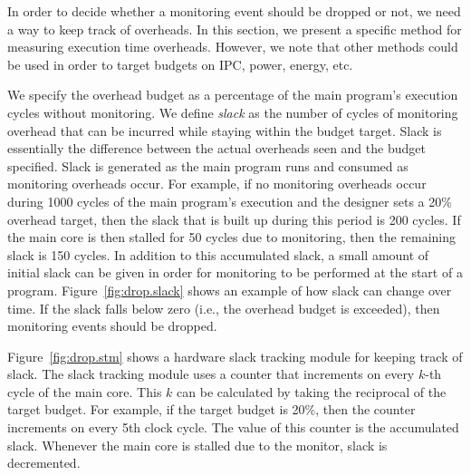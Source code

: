 In order to decide whether a monitoring event should be dropped or not, we need
a way to keep track of overheads. In this section, we present a specific method
for measuring execution time overheads. However, we note that other methods
could be used in order to target budgets on IPC, power, energy, etc.  

We specify the overhead budget as a percentage of the main program's execution
cycles without monitoring. We define \emph{slack} as the number of cycles of
monitoring overhead that can be incurred while staying within the budget
target. Slack is essentially the difference between the actual overheads seen
and the budget specified. Slack is generated as the main program runs and consumed as monitoring overheads occur.  For
example, if no monitoring overheads occur during 1000 cycles of the main
program's execution and the designer sets a 20\% overhead target, then the
slack that is built up during this period is 200 cycles. If the main core is
then stalled for 50 cycles due to monitoring, then the remaining slack is 150
cycles. 
In addition to this accumulated slack, a small amount of initial slack
can be given in order for monitoring to be performed at the start of a program.
Figure~\ref{fig:drop.slack} shows an example of how slack can change over time.
If the slack falls below zero (i.e., the overhead budget is exceeded), then
monitoring events should be dropped.

Figure~\ref{fig:drop.stm} shows a hardware slack tracking module for
keeping track of slack. The slack tracking module uses a counter that increments on every $k$-th
cycle of the main core. This $k$ can be calculated by taking the reciprocal of
the target budget. For example, if the target budget is 20\%, then the counter
increments on every 5th clock cycle. The value of this counter is the
accumulated slack. Whenever the main core is stalled due to the monitor, slack
is decremented.

